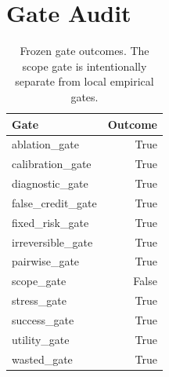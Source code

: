 \documentclass{article}
\begin{document}
\clearpage
\appendix

\section{Gate Audit}
\begin{table}[h]
\centering
\caption{Frozen gate outcomes. The scope gate is intentionally separate from local empirical gates.}
\begin{tabular}{lr}
\toprule
Gate & Outcome\\
\midrule
ablation\_gate & True \\
calibration\_gate & True \\
diagnostic\_gate & True \\
false\_credit\_gate & True \\
fixed\_risk\_gate & True \\
irreversible\_gate & True \\
pairwise\_gate & True \\
scope\_gate & False \\
stress\_gate & True \\
success\_gate & True \\
utility\_gate & True \\
wasted\_gate & True \\
\bottomrule
\end{tabular}
\end{table}
\end{document}
